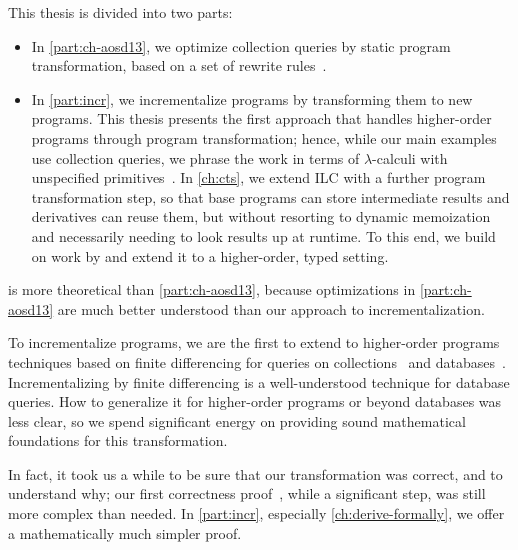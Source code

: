This thesis is divided into two parts:
\begin{itemize}
\item In \cref{part:ch-aosd13}, we optimize collection
  queries by static program transformation, based on a set of rewrite
  rules~\citep{GiarrussoAOSD13}.
\item In \cref{part:incr}, we incrementalize programs by transforming them to
  new programs. This thesis presents the first approach that
  handles higher-order programs through program transformation; hence, while
  our main examples use collection queries, we phrase the work in terms of
  $\lambda$-calculi with unspecified primitives~\citep*{CaiEtAl2014ILC}.
  In \cref{ch:cts}, we extend ILC with a further program transformation
  step, so that base programs can store intermediate results and derivatives can
  reuse them, but without resorting to dynamic memoization and necessarily
  needing to look results up at runtime. To this end, we build on work by
  \citet{Liu00} and extend it to a higher-order, typed setting.
\end{itemize}

 is more theoretical than
\cref{part:ch-aosd13}, because optimizations in
\cref{part:ch-aosd13} are much better understood than our approach to
incrementalization.

To incrementalize programs, we are the first to extend to higher-order programs
techniques based on finite differencing for queries on
collections~\citep{Paige82FDC} and
databases~\citep{Blakeley:1986:EUM,Gupta99MMV}.
Incrementalizing by finite differencing is a well-understood technique for
database queries. How to generalize it for higher-order programs or beyond
databases was less clear, so we spend significant energy on providing sound
mathematical foundations for this transformation.

In fact, it took us a while to be sure that our transformation was correct, and
to understand why; our first correctness proof~\citep*{CaiEtAl2014ILC}, while a
significant step, was still more complex than needed. In \cref{part:incr},
especially \cref{ch:derive-formally}, we offer a mathematically much simpler
proof.


